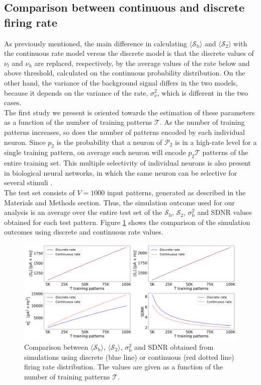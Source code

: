\documentclass[a4paper, 12pt, twoside, openright]{book}
\newcommand{\popII}{\mathcal{P}_2}
\newcommand{\T}{\mathcal{T}}
\newcommand{\SII}{\mathcal{S}_\text{2}}
\newcommand{\Sb}{\mathcal{S}_\text{b}}
\newcommand{\varSb}{\sigma^{2}_\text{b}}
\begin{document}
\subsection{Comparison between continuous and discrete firing rate}
As previously mentioned, the main difference in calculating
$\langle\Sb\rangle$ and $\langle\SII\rangle$ with the continuous rate model versus the discrete model is that the discrete values of $\nu_l$ and $\nu_h$ are replaced, respectively, by the average values of the rate below and above threshold, calculated on the continuous probability distribution.
On the other hand, the variance of the background signal differs in the two models, because it depends on the variance of the rate, $\sigma^2_{\nu}$, which is different in the two cases.\\
The first study we present is oriented towards the estimation of these parameters as a function of the number of training patterns $\T$.
As the number of training patterns increases, so does the number of patterns encoded by each individual neuron.
Since $p_2$ is the probability that a neuron of $\popII$ is in a high-rate level for a single training pattern, on average such neuron will encode $p_2 \T$ patterns of the entire training set.
This multiple selectivity of individual neurons is also present in biological neural networks, in which the same neuron can be selective for several stimuli \cite{Rigotti2013}.\\
The test set consists of $V = 1000$ input patterns, generated as described in the Materials and Methods section.
Thus, the simulation outcome used for our analysis is an average over the entire test set of the $\Sb$, $\SII$, $\varSb$ and SDNR values obtained for each test pattern.
Figure \ref{fig:discr_vs_contin} shows the comparison of the simulation outcomes using discrete and continuous rate values.

\begin{figure}[H]
\centering
	\includegraphics[width=\columnwidth]{figures/discrete_vs_continuous.png}
	\caption{ 
	Comparison between $\langle\Sb\rangle$, $\langle\SII\rangle$, $\varSb$ and SDNR obtained from simulations using discrete (blue line) or continuous (red dotted line) firing rate distribution. The values are given as a function of the number of training patterns $\T$.
	\label{fig:discr_vs_contin}}
\end{figure}
\end{document}
